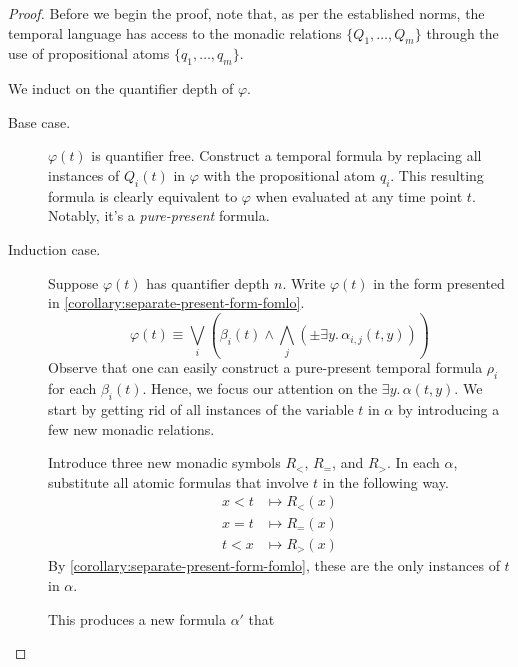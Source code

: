 \documentclass[a4paper,UKenglish,cleveref, autoref, thm-restate, numberwithinsect]{lipics-v2021}
\begin{document}
\begin{proof}
    Before we begin the proof, note that, as per the established norms, the temporal language has access to the monadic relations $\{Q_1, \ldots, Q_m\}$ through the use of propositional atoms $\{q_1, \ldots, q_m\}$.

    We induct on the quantifier depth of $\varphi$.
    \begin{description} %
        \item[Base case.] $\varphi(t)$ is quantifier free. Construct a temporal formula by replacing all instances of $Q_i(t)$ in $\varphi$ with the propositional atom $q_i$. This resulting formula is clearly equivalent to $\varphi$ when evaluated at any time point $t$. Notably, it's a \textit{pure-present} formula.
        \item[Induction case.] Suppose $\varphi(t)$ has quantifier depth $n$. Write $\varphi(t)$ in the form presented in \cref{corollary:separate-present-form-fomlo}.
        \begin{equation}
            \label{eq:present-separate-form-fomlo}
            \varphi(t) \equiv \bigvee_i \left( \beta_i(t) \land \bigwedge_j \left( \pm \exists y.\, \alpha_{i, j}\left(t, y\right) \right) \right)
        \end{equation}
        Observe that one can easily construct a pure-present temporal formula $\rho_i$ for each $\beta_i(t)$. Hence, we focus our attention on the $\exists y.\, \alpha(t, y)$. We start by getting rid of all instances of the variable $t$ in $\alpha$ by introducing a few new monadic relations.

        Introduce three new monadic symbols $R_<$, $R_=$, and $R_>$. In each $\alpha$, substitute all atomic formulas that involve $t$ in the following way.
        \begin{equation*}
            \begin{aligned}
                x < t &\longmapsto R_<(x)\\
                x = t &\longmapsto R_=(x)\\
                t < x  &\longmapsto R_>(x)
            \end{aligned}
        \end{equation*}
        By \cref{corollary:separate-present-form-fomlo}, these are the only instances of $t$ in $\alpha$.

        This produces a new formula $\alpha'$ that


\end{description}
\end{proof}
\end{document}
